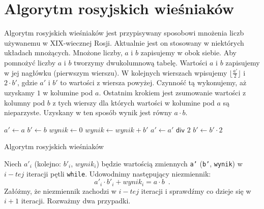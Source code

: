 \section{Algorytm rosyjskich wieśniaków}



Algorytm rosyjskich wieśniaków jest przypisywany sposobowi mnożenia liczb używanemu w XIX-wiecznej Rosji.
Aktualnie jest on stosowany w niektórych układach mnożących.
Mnożone liczby, $a$ i $b$ zapisujemy w obok siebie.
Aby pomnożyć liczby $a$ i $b$ tworzymy dwukolumnową tabelę.
Wartości $a$ i $b$ zapisujemy w jej nagłówku (pierwszym wierszu).
W kolejnych wierszach wpisujemy $\lfloor\frac{a'}{2}\rfloor$ i $2 \cdot b'$, gdzie $a'$ i $b'$ to wartości z wiersza powyżej. 
Czynność tą wykonujemy, aż uzyskamy $1$ w kolumine pod $a$. 
Ostatnim krokiem jest zsumowanie wartości z kolumny pod $b$ z tych wierszy dla których wartości w kolumine pod $a$ są nieparzyste.
Uzyskany w ten sposób wynik jest równy $a \cdot b$.

\begin{algorithm}[h]
  \DontPrintSemicolon
  
  
  
  $a' \leftarrow a$\;
  $b' \leftarrow b$\;
  $wynik \leftarrow 0$\;
  {
    {
      $wynik \leftarrow wynik + b'$\;
    }
    $a' \leftarrow a' \textsf{ div } 2$\;
    $b' \leftarrow b' \cdot 2$\;
  }
  
  \caption{Algorytm rosyjskich wieśniaków}
  \label{alg-wiesniakow}
\end{algorithm}

Niech $a'_i$ (kolejno: $b'_i$, $wynik_i$) będzie wartością zmiennych \texttt{a'} (\texttt{b'}, \texttt{wynik}) w $i-tej$ iteracji pętli \texttt{while}. 
Udowodnimy następujący niezmiennik:
\[
a'_i \cdot b'_i + wynik_i = a \cdot b \enspace.
\]
Załóżmy, że niezmiennik zachodzi w $i-tej$ iteracji i sprawdźmy co dzieje się w $i+1$ iteracji.
Rozważmy dwa przypadki.



